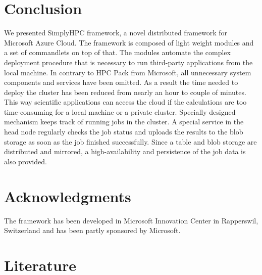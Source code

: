 \documentclass[3p,times]{elsarticle}
\begin{document}



\section{Conclusion}
\label{sec:conclusions}

We presented SimplyHPC framework, a novel distributed framework for Microsoft Azure Cloud. The framework is composed of light weight modules and a set of commandlets on top of that. The modules automate the complex deployment procedure that is necessary to run third-party applications from the local machine. In contrary to HPC Pack from Microsoft, all unnecessary system components and services have been omitted. As a result the time needed to deploy the cluster has been reduced from nearly an hour to couple of minutes.  This way scientific applications can access the cloud if the calculations are too time-consuming for a local machine or a private cluster. Specially designed mechanism keeps track of running jobs in the cluster. A special service in the head node regularly checks the job status and uploads the results to the blob storage as soon as the job finished successfully. Since a table and blob storage are distributed and mirrored, a high-availability and persistence of the job data is also provided.



\section{Acknowledgments}
\label{sec:ackn}

The framework has been developed in Microsoft Innovation Center in Rapperswil, Switzerland and has been partly sponsored by Microsoft. 

\section{Literature}
\label{sec:literature}



\end{document}
